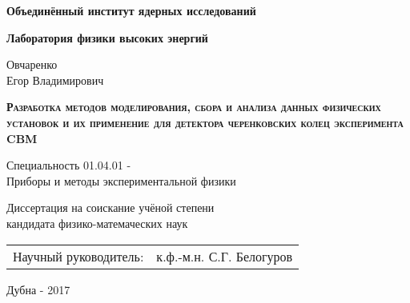 \begin{titlepage}

\centering

\textbf{
Объединённый институт ядерных исследований
}


\textbf{
Лаборатория физики высоких энергий
}

\vspace{1cm}

Овчаренко \\
Егор Владимирович

\vspace{2cm}

\textbf{
\textsc{
Разработка методов моделирования, сбора и анализа данных физических установок и их применение для детектора черенковских колец эксперимента CBM
}
}

\vspace{2cm}

Специальность 01.04.01 - \\
Приборы и методы экспериментальной физики

\vspace{2cm}

Диссертация на соискание учёной степени \\
кандидата физико-матемаческих наук

\vspace{2cm}

\begin{tabu} to \textwidth { X[l] X[r] }
	{Научный руководитель:} & {к.ф.-м.н. С.Г. Белогуров} \\
\end{tabu}

\vspace{2cm}

Дубна - 2017

\end{titlepage}
